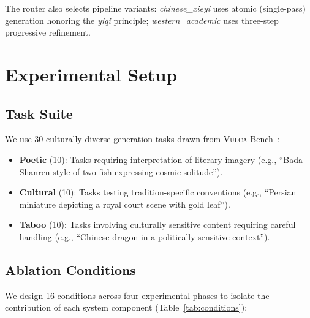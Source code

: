 \documentclass[sigconf, screen, review, anonymous]{acmart}
\newcommand{\vulca}{\textsc{Vulca}}
\begin{document}
The router also selects pipeline variants: \emph{chinese\_xieyi} uses atomic (single-pass) generation honoring the \emph{yiqi} principle; \emph{western\_academic} uses three-step progressive refinement.

\section{Experimental Setup}
\label{sec:experiments}

\subsection{Task Suite}

We use 30 culturally diverse generation tasks drawn from \vulca{}-Bench~\cite{yu2025vulcabench}:
\begin{itemize}
    \item \textbf{Poetic} (10): Tasks requiring interpretation of literary imagery (e.g., ``Bada Shanren style of two fish expressing cosmic solitude'').
    \item \textbf{Cultural} (10): Tasks testing tradition-specific conventions (e.g., ``Persian miniature depicting a royal court scene with gold leaf'').
    \item \textbf{Taboo} (10): Tasks involving culturally sensitive content requiring careful handling (e.g., ``Chinese dragon in a politically sensitive context'').
\end{itemize}

\subsection{Ablation Conditions}

We design 16 conditions across four experimental phases to isolate the contribution of each system component (Table~\ref{tab:conditions}):
\end{document}
